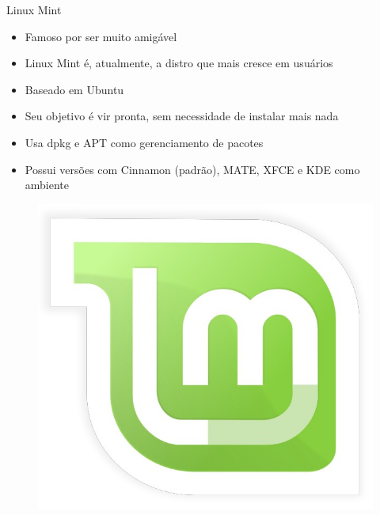\documentclass{beamer}
\begin{document}
\begin{frame}{Linux Mint}
    \begin{itemize}
        \item{Famoso por ser muito amigável}
        \item{Linux Mint é, atualmente, a distro que mais cresce em usuários}
        \item{Baseado em Ubuntu}
        \item{Seu objetivo é vir pronta, sem necessidade de instalar mais nada}
        \item{Usa dpkg e APT como gerenciamento de pacotes}
        \item{Possui versões com Cinnamon (padrão), MATE, XFCE e KDE como ambiente}
    \end{itemize}
    \begin{figure}[h!]
        \centering
        \includegraphics[scale=0.10]{mint.png}
    \end{figure}
\end{frame}
\end{document}

